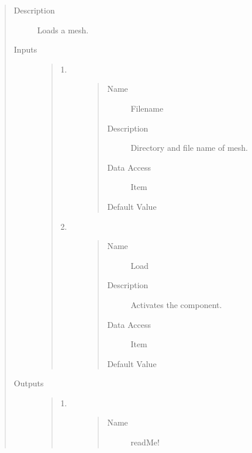 \documentclass[letterpaper,10pt,english]{sphinxmanual}
\begin{document}
\begin{quote}\begin{description}
\item[{Description}] \leavevmode
Loads a mesh.

\item[{Inputs}] \leavevmode\begin{quote}\begin{description}
\item[{1.}] \leavevmode\begin{quote}\begin{description}
\item[{Name}] \leavevmode
Filename

\item[{Description}] \leavevmode
Directory and file name of mesh.

\item[{Data Access}] \leavevmode
Item

\item[{Default Value}] \leavevmode
{}

\end{description}\end{quote}

\item[{2.}] \leavevmode\begin{quote}\begin{description}
\item[{Name}] \leavevmode
Load

\item[{Description}] \leavevmode
Activates the component.

\item[{Data Access}] \leavevmode
Item

\item[{Default Value}] \leavevmode
{}

\end{description}\end{quote}

\end{description}\end{quote}

\item[{Outputs}] \leavevmode\begin{quote}\begin{description}
\item[{1.}] \leavevmode\begin{quote}\begin{description}
\item[{Name}] \leavevmode
readMe!


\end{description}
\end{quote}
\end{description}
\end{quote}
\end{description}
\end{quote}
\end{document}
